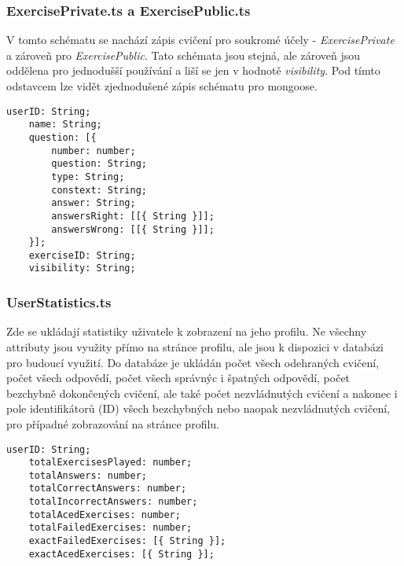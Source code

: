 \documentclass[12pt]{report}
\begin{document}
\subsubsection{ExercisePrivate.ts a ExercisePublic.ts}
V tomto schématu se nachází zápis cvičení pro soukromé účely - \emph{ExercisePrivate} a zároveň pro \emph{ExercisePublic}. Tato schémata jsou stejná, ale zároveň jsou oddělena pro jednodušší používání a liší se jen v hodnotě \emph{visibility}. Pod tímto odstavcem lze vidět zjednodušené zápis schématu pro mongoose.
\par
\vspace{1cm}
\begin{lstlisting}[style=ES6, caption={\lbrack Kód\rbrack Schéma pro mongoose pro cvičení}]
    userID: String;
    name: String;
    question: [{
        number: number;
        question: String;
        type: String;
        constext: String;
        answer: String;
        answersRight: [[{ String }]];
        answersWrong: [[{ String }]];  
    }];
    exerciseID: String;
    visibility: String;
\end{lstlisting}

\subsubsection{UserStatistics.ts}
Zde se ukládají statistiky uživatele k zobrazení na jeho profilu. Ne všechny attributy jsou využity přímo na stránce profilu, ale jsou k dispozici v databázi pro budoucí využití. Do databáze je ukládán počet všech odehraných cvičení, počet všech odpovědí, počet všech správnýc i špatných odpovědí, počet bezchybně dokončených cvičení, ale také počet nezvládnutých cvičení a nakonec i pole identifikátorů (ID) všech bezchybných nebo naopak nezvládnutých cvičení, pro případné zobrazování na stránce profilu.
\par
\vspace{1cm}

\begin{lstlisting}[style=ES6, caption={\lbrack Kód\rbrack Schéma pro mongoose pro statistiky uživatele}]
    userID: String;
    totalExercisesPlayed: number;
    totalAnswers: number;
    totalCorrectAnswers: number;
    totalIncorrectAnswers: number;
    totalAcedExercises: number;
    totalFailedExercises: number;
    exactFailedExercises: [{ String }];
    exactAcedExercises: [{ String }];
\end{lstlisting}
\end{document}
